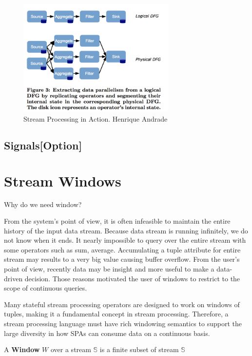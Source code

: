 \begin{figure}[htbp!] 
\centering    
\includegraphics[width=0.7\textwidth]{logicalPhysicalDataFlow}
\caption[Minion]{Stream Processing in Action. Henrique Andrade\citep{Henrique:2013}}
\label{fig:streamRepresent}
\end{figure}

   
\subsection*{Signals[Option]}    \citep{Golab:2010} 
    
    
\section{Stream Windows}

Why do we need window?

From the system's point of view, it is often infeasible to maintain the entire history of the input data stream. Because data stream is running infinitely, we do not know when it ends. It nearly impossible to query over the entire stream with some operators such as sum, average. Accumulating a tuple attribute for entire stream may results to a very big value causing  buffer overflow. From the user's point of view, recently data may be insight and more useful to make a data-driven decision. Those reasons motivated the user of windows to restrict to the scope of continuous queries. 

Many stateful stream processing operators are designed to work on windows of tuples, making it a fundamental concept in stream processing. Therefore, a stream processing language must have rich windowing semantics to support the large diversity in how SPAs can consume data on a continuous basis.

\begin{defi}
A \textbf{Window} $W$ over a stream $\mathbb{S}$ is a finite subset of stream $\mathbb{S}$ \cite{Dindar:2013}
\end{defi}


